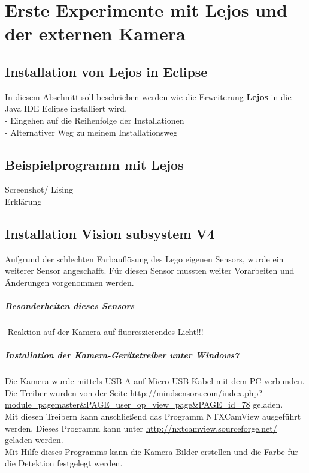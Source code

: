 \chapter{Erste Experimente mit Lejos und der externen Kamera}
\section{Installation von Lejos in Eclipse}
In diesem Abschnitt soll beschrieben werden wie die Erweiterung \textbf{Lejos} in die Java IDE Eclipse installiert wird.\\ 
- Eingehen auf die Reihenfolge der Installationen\\
- Alternativer Weg zu meinem Installationsweg \\

\section{Beispielprogramm mit Lejos}
Screenshot/ Lising\\
Erklärung \\


\section{Installation Vision subsystem V4}
Aufgrund der schlechten Farbauflösung des Lego eigenen Sensors, wurde ein weiterer Sensor angeschafft. Für diesen Sensor mussten weiter Vorarbeiten und Änderungen vorgenommen werden.
\paragraph{Besonderheiten dieses Sensors}
-Reaktion auf der Kamera auf fluoreszierendes Licht!!!

\paragraph{Installation der Kamera-Gerätetreiber unter Windows7}
Die Kamera wurde mittels USB-A auf Micro-USB Kabel mit dem PC verbunden.
Die Treiber wurden von der Seite \url{http://mindsensors.com/index.php?module=pagemaster&PAGE_user_op=view_page&PAGE_id=78} geladen.\\
Mit diesen Treibern kann anschließend das Programm NTXCamView ausgeführt werden. Dieses Programm kann unter \url{http://nxtcamview.sourceforge.net/} geladen werden.\\
Mit Hilfe dieses Programms kann die Kamera Bilder erstellen und die Farbe für die Detektion festgelegt werden. 

